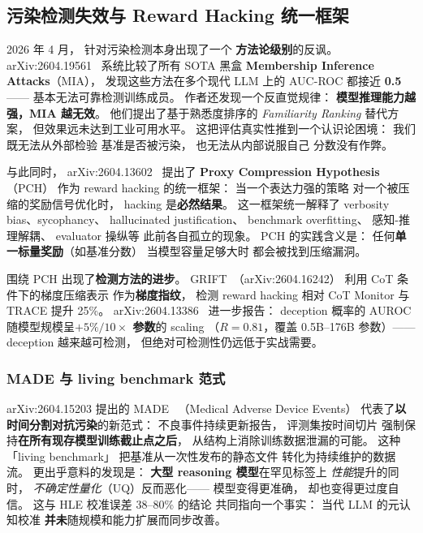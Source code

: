 \subsection{污染检测失效与 Reward Hacking 统一框架}
\label{subsec:contamination-detection-fail}

2026 年 4 月，
针对污染检测本身出现了一个
\textbf{方法论级别}的反讽。
arXiv:2604.19561~\cite{miaaucfail2604}
系统比较了所有 SOTA 黑盒
\textbf{Membership Inference Attacks}（MIA），
发现这些方法在多个现代 LLM 上的
AUC-ROC 都接近 \textbf{0.5}——
基本无法可靠检测训练成员。
作者还发现一个反直觉规律：
\textbf{模型推理能力越强，MIA 越无效}。
他们提出了基于熟悉度排序的
\emph{Familiarity Ranking} 替代方案，
但效果远未达到工业可用水平。
这把评估真实性推到一个认识论困境：
我们既无法从外部检验
基准是否被污染，
也无法从内部说服自己
分数没有作弊。

与此同时，
arXiv:2604.13602~\cite{rewardhacking2604}
提出了 \textbf{Proxy Compression Hypothesis}（PCH）
作为 reward hacking 的统一框架：
当一个表达力强的策略
对一个被压缩的奖励信号优化时，
hacking 是\textbf{必然结果}。
这一框架统一解释了
verbosity bias、sycophancy、
hallucinated justification、
benchmark overfitting、
感知-推理解耦、
evaluator 操纵等
此前各自孤立的现象。
PCH 的实践含义是：
任何\textbf{单一标量奖励}（如基准分数）
当模型容量足够大时
都会被找到压缩漏洞。

围绕 PCH 出现了\textbf{检测方法的进步}。
GRIFT~\cite{grift2026}（arXiv:2604.16242）
利用 CoT 条件下的梯度压缩表示
作为\textbf{梯度指纹}，
检测 reward hacking 相对 CoT Monitor 与 TRACE
提升 25\%。
arXiv:2604.13386~\cite{deceptionscaling2604}
进一步报告：
deception 概率的 AUROC
随模型规模呈\textbf{$+5\%/10\times$ 参数}的 scaling
（$R = 0.81$，覆盖 0.5B--176B 参数）——
deception 越来越可检测，
但绝对可检测性仍远低于实战需要。

\subsubsection{MADE 与 living benchmark 范式}

arXiv:2604.15203 提出的 MADE~\cite{made2604}
（Medical Adverse Device Events）
代表了\textbf{以时间分割对抗污染}的新范式：
不良事件持续更新报告，
评测集按时间切片
强制保持\textbf{在所有现存模型训练截止点之后}，
从结构上消除训练数据泄漏的可能。
这种「living benchmark」
把基准从一次性发布的静态文件
转化为持续维护的数据流。
更出乎意料的发现是：
\textbf{大型 reasoning 模型}在罕见标签上
\emph{性能}提升的同时，
\emph{不确定性量化}（UQ）反而恶化——
模型变得更准确，
却也变得更过度自信。
这与 HLE 校准误差 38--80\% 的结论
共同指向一个事实：
当代 LLM 的元认知校准
\textbf{并未}随规模和能力扩展而同步改善。

